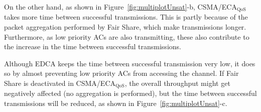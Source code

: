 On the other hand, as shown in Figure~\ref{fig:multiplotUnsat}-b, CSMA/ECA$_{\text{QoS}}$ takes more time between successful transmissions. This is partly because of the packet aggregation performed by Fair Share, which make transmissions longer. Furthermore, as low priority ACs are also transmitting, these also contribute to the increase in the time between successful transmissions. 

Although EDCA keeps the time between successful transmission very low, it does so by almost preventing low priority ACs from accessing the channel. If Fair Share is deactivated in CSMA/ECA$_{\text{QoS}}$, the overall throughput might get negatively affected (no aggregation is performed), but the time between successful transmissions will be reduced, as shown in Figure~\ref{fig:multiplotUnsat}-c.
	
%
	

	

